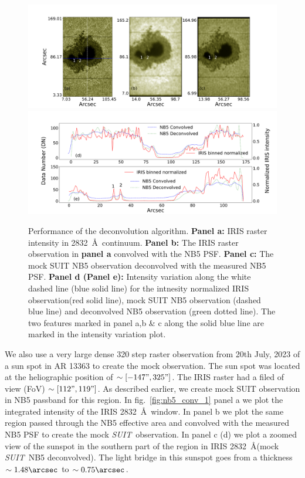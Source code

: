 \documentclass[a4paper,11pt]{article}
\newcommand{\suit}{{\it SUIT}}
\begin{document}
\begin{figure}[ht!]
    \centering
    \includegraphics[trim={3cm 0cm 4cm 3cm},clip,width=\textwidth]{deconvolve_part_1.pdf}
    \includegraphics[trim={1cm 0cm 1cm 2.8cm},clip,width=\textwidth]{deconvolve_part_2.pdf}
    \caption{Performance of the deconvolution algorithm. \textbf{Panel a:} IRIS raster intensity in 2832~\AA~continuum. \textbf{Panel b:} The IRIS raster observation in \textbf{panel a} convolved with the NB5 PSF. \textbf{Panel c:} The mock SUIT NB5 observation deconvolved with the measured NB5 PSF. \textbf{Panel d (Panel e):} Intensity variation along the white dashed line (blue solid line) for the intnesity normalized IRIS observation(red solid line), mock SUIT NB5 observation (dashed blue line) and deconvolved NB5 observation (green dotted line). The two features marked in panel a,b \& c along the solid blue line are marked in the intensity variation plot.}
    \label{fig:deconv}
\end{figure}

We also use a very large dense 320 step raster observation from 20th July, 2023 of a sun spot in AR 13363 to create the mock observation. The sun spot was located at the heliographic position of $\sim [-147",325"]$. The IRIS raster had a filed of view (FoV) $\sim [112",119"]$. As described earlier, we create mock SUIT observation in NB5 passband for this region. In fig.~\ref{fig:nb5_conv_1} panel a we plot the integrated intensity of the IRIS 2832~\AA~window. In panel b we plot the same region passed through the NB5 effective area and convolved with the measured NB5 PSF to create the mock \suit~observation. In panel c (d) we plot a zoomed view of the sunspot in the southern part of the region in IRIS 2832~\AA (mock \suit~NB5 deconvolved). The light bridge in this sunspot goes from a thickness $\sim 1.48\arcsec$ to $\sim 0.75\arcsec$. 
\end{document}
